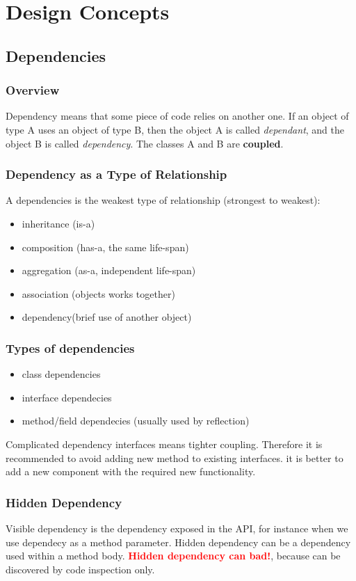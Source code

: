 \documentclass{report}
\begin{document}
\part{Design Concepts}

\chapter{Dependencies}
\section{Overview}
Dependency means that some piece of code relies on another one. If an object of type A uses an object of type B, 
then the object A is called \textit{dependant}, and the object B is called \textit{dependency}. The classes A and B are \textbf{coupled}. 

\section{Dependency as a Type of Relationship}
A dependencies is the weakest
type of relationship (strongest to weakest):
\begin{itemize}
	\item inheritance (is-a)
	\item composition (has-a, the same life-span)
	\item aggregation (as-a, independent life-span)
	\item association (objects works together)
	\item dependency(brief use of another object)
\end{itemize}

\section{Types of dependencies}
\begin{itemize}
	\item class dependencies
	\item interface dependecies
	\item method/field dependecies (usually used by reflection)
\end{itemize}

Complicated dependency interfaces means tighter coupling. Therefore it is recommended to avoid adding new method to existing interfaces.
it is better to add a new component with the required new functionality.

\section{Hidden Dependency}
Visible dependency is the dependency exposed in the API, for instance when we use dependecy as a method parameter. Hidden dependency can be
a dependency used within a method body. \textbf{\textcolor{red}{Hidden dependency can bad!}}, because can be discovered by code inspection only.
\end{document}
